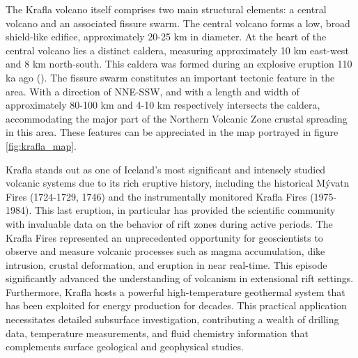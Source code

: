 The Krafla volcano itself comprises two main structural elements: a central volcano and an associated fissure swarm. The central volcano forms a low, broad shield-like edifice, approximately 20-25 km in diameter. At the heart of the central volcano lies a distinct caldera, measuring approximately 10 km east-west and 8 km north-south. This caldera was formed during an explosive eruption 110 ka ago (\cite{sæmundsson1991}).
The fissure swarm constitutes an important tectonic feature in the area. With a direction of NNE-SSW, and with a length and width of approximately 80-100 km and 4-10 km respectively intersects the caldera, accommodating the major part of the Northern Volcanic Zone crustal spreading in this area. These features can be appreciated in the map portrayed in figure \ref{fig:krafla_map}.

Krafla stands out as one of Iceland's most significant and intensely studied volcanic systems due to its rich eruptive history, including the historical Mývatn Fires (1724-1729, 1746) and the instrumentally monitored Krafla Fires (1975-1984). This last eruption, in particular has provided the scientific community with invaluable data on the behavior of rift zones during active periods. The Krafla Fires represented an unprecedented opportunity for geoscientists to observe and measure volcanic processes such as magma accumulation, dike intrusion, crustal deformation, and eruption in near real-time. This episode significantly advanced the understanding of volcanism in extensional rift settings.
Furthermore, Krafla hosts a powerful high-temperature geothermal system that has been exploited for energy production for decades. This practical application necessitates detailed subsurface investigation, contributing a wealth of drilling data, temperature measurements, and fluid chemistry information that complements surface geological and geophysical studies.

